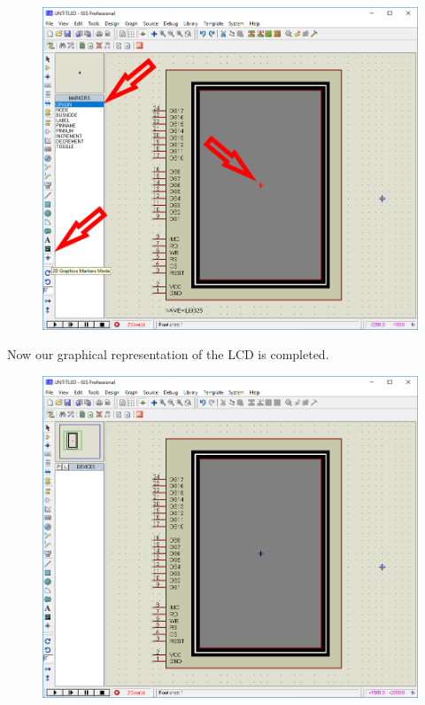 \documentclass{article}
\def\imgscale{0.23}
\begin{document}
\begin{figure}[!ht]
\centering
\includegraphics [scale=\imgscale] {Images/03-panel/6-orgin-marker.png}
\end{figure}


Now our graphical representation of the LCD is completed.

\begin{figure}[!ht]
\centering
\includegraphics [scale=\imgscale] {Images/03-panel/7-2d-cmplt.png}
\end{figure}
\end{document}
